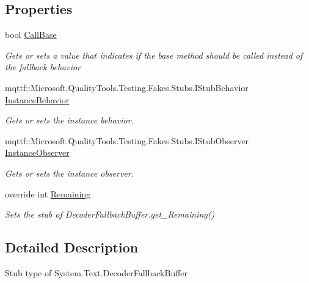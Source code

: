 \subsection*{Properties}
\begin{DoxyCompactItemize}
\item 
bool \hyperlink{class_system_1_1_text_1_1_fakes_1_1_stub_decoder_fallback_buffer_ac482e51f6e54954b7484de7d2730bb92}{Call\-Base}
\begin{DoxyCompactList}\small\item\em Gets or sets a value that indicates if the base method should be called instead of the fallback behavior\end{DoxyCompactList}\item 
mqttf\-::\-Microsoft.\-Quality\-Tools.\-Testing.\-Fakes.\-Stubs.\-I\-Stub\-Behavior \hyperlink{class_system_1_1_text_1_1_fakes_1_1_stub_decoder_fallback_buffer_a037c0a6ca1ecfe19317aa682f43411fd}{Instance\-Behavior}
\begin{DoxyCompactList}\small\item\em Gets or sets the instance behavior.\end{DoxyCompactList}\item 
mqttf\-::\-Microsoft.\-Quality\-Tools.\-Testing.\-Fakes.\-Stubs.\-I\-Stub\-Observer \hyperlink{class_system_1_1_text_1_1_fakes_1_1_stub_decoder_fallback_buffer_a378c3e57862b43c94f4dba9f32feb818}{Instance\-Observer}
\begin{DoxyCompactList}\small\item\em Gets or sets the instance observer.\end{DoxyCompactList}\item 
override int \hyperlink{class_system_1_1_text_1_1_fakes_1_1_stub_decoder_fallback_buffer_a7eb3a8c797b5257f1deb4478e1cfe6c5}{Remaining}
\begin{DoxyCompactList}\small\item\em Sets the stub of Decoder\-Fallback\-Buffer.\-get\-\_\-\-Remaining()\end{DoxyCompactList}\end{DoxyCompactItemize}


\subsection{Detailed Description}
Stub type of System.\-Text.\-Decoder\-Fallback\-Buffer



